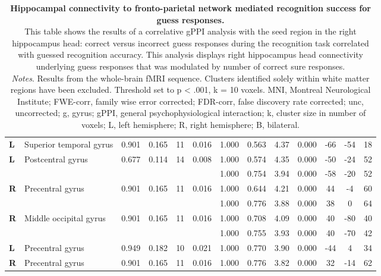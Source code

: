 \begin{landscape}
\begin{table}[!ht]
\begin{tabular}{ll|cccc|cccc|ccc}
        \textbf{L} & Superior temporal gyrus & 0.901 & 0.165 & 11 & 0.016 & 1.000 & 0.563 & 4.37 & 0.000 & -66 & -54 & 18 \\
        \textbf{L} & Postcentral gyrus & 0.677 & 0.114 & 14 & 0.008 & 1.000 & 0.574 & 4.35 & 0.000 & -50 & -24 & 52 \\
        & & & & & & 1.000 & 0.754 & 3.94 & 0.000 & -58 & -20 & 52 \\
        \textbf{R} & Precentral gyrus & 0.901 & 0.165 & 11 & 0.016 & 1.000 & 0.644 & 4.21 & 0.000 & 44 & -4 & 60 \\
        & & & & & & 1.000 & 0.776 & 3.88 & 0.000 & 38 & 0 & 64 \\
        \textbf{R} & Middle occipital gyrus & 0.901 & 0.165 & 11 & 0.016 & 1.000 & 0.708 & 4.09 & 0.000 & 40 & -80 & 40 \\
        & & & & & & 1.000 & 0.755 & 3.93 & 0.000 & 40 & -70 & 42 \\
        \textbf{L} & Precentral gyrus & 0.949 & 0.182 & 10 & 0.021 & 1.000 & 0.770 & 3.90 & 0.000 & -44 & 4 & 34 \\
        \textbf{R} & Precentral gyrus & 0.901 & 0.165 & 11 & 0.016 & 1.000 & 0.776 & 3.82 & 0.000 & 32 & -14 & 62 \\
    \end{tabular}

    \vspace{1.0 em}
    \caption{\textbf{Hippocampal connectivity to fronto-parietal network mediated recognition success for guess responses.} \\ 
    This table shows the results of a correlative gPPI analysis with the seed region in the right hippocampus head: correct versus incorrect guess responses during the recognition task correlated with guessed recognition accuracy. This analysis displays right hippocampus head connectivity underlying guess responses that was modulated by number of correct sure responses.  
    \\ \vspace{1.0 em} \textit{Notes}. Results from the whole-brain fMRI sequence. Clusters identified solely within white matter regions have been excluded. Threshold set to p < .001, k = 10 voxels. MNI, Montreal Neurological Institute; FWE-corr, family wise error corrected; FDR-corr, false discovery rate corrected; unc, uncorrected; g, gyrus; gPPI, general psychophysiological interaction; k, cluster size in number of voxels; L, left hemisphere; R, right hemisphere; B, bilateral.}
    \label{tab:Recog_unconsc_Accuracy}
\end{table}
\end{landscape}